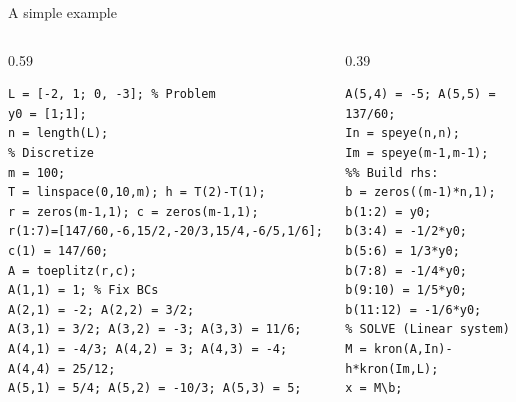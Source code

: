 \documentclass[aspectratio=169,xcolor=dvipsnames]{beamer}
\begin{document}
\begin{frame}[fragile]{A simple example}
\begin{columns}
\begin{column}{0.59\columnwidth}
\begin{verbatim}
L = [-2, 1; 0, -3]; % Problem
y0 = [1;1];
n = length(L);
% Discretize
m = 100;
T = linspace(0,10,m); h = T(2)-T(1);
r = zeros(m-1,1); c = zeros(m-1,1);
r(1:7)=[147/60,-6,15/2,-20/3,15/4,-6/5,1/6];
c(1) = 147/60;
A = toeplitz(r,c);
A(1,1) = 1; % Fix BCs
A(2,1) = -2; A(2,2) = 3/2;
A(3,1) = 3/2; A(3,2) = -3; A(3,3) = 11/6;
A(4,1) = -4/3; A(4,2) = 3; A(4,3) = -4; A(4,4) = 25/12;
A(5,1) = 5/4; A(5,2) = -10/3; A(5,3) = 5; 
\end{verbatim}
\end{column}
\begin{column}{0.39\columnwidth}
\begin{verbatim}
A(5,4) = -5; A(5,5) = 137/60;
In = speye(n,n);
Im = speye(m-1,m-1);
%% Build rhs:
b = zeros((m-1)*n,1); 
b(1:2) = y0; 
b(3:4) = -1/2*y0;
b(5:6) = 1/3*y0; 
b(7:8) = -1/4*y0;
b(9:10) = 1/5*y0; 
b(11:12) = -1/6*y0;
% SOLVE (Linear system)
M = kron(A,In)-h*kron(Im,L);
x = M\b;
\end{verbatim}
\end{column}
\end{columns}
\end{frame}
\end{document}
